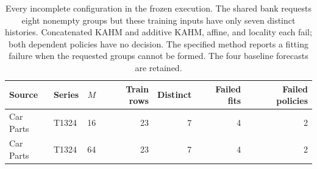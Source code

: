 \begin{table}[!htbp]
\centering\small\setlength{\tabcolsep}{4pt}
\caption{Every incomplete configuration in the frozen execution. The shared bank requests eight nonempty groups but these training inputs have only seven distinct histories. Concatenated KAHM and additive KAHM, affine, and locality each fail; both dependent policies have no decision. The specified method reports a fitting failure when the requested groups cannot be formed. The four baseline forecasts are retained.}
\label{tab:utility-failures}
\begin{tabular}{llrrrrr}
\toprule
Source & Series & $M$ & Train rows & Distinct & Failed fits & Failed policies \\
\midrule
Car Parts & T1324 & 16 & 23 & 7 & 4 & 2 \\
Car Parts & T1324 & 64 & 23 & 7 & 4 & 2 \\
\bottomrule
\end{tabular}
\end{table}
